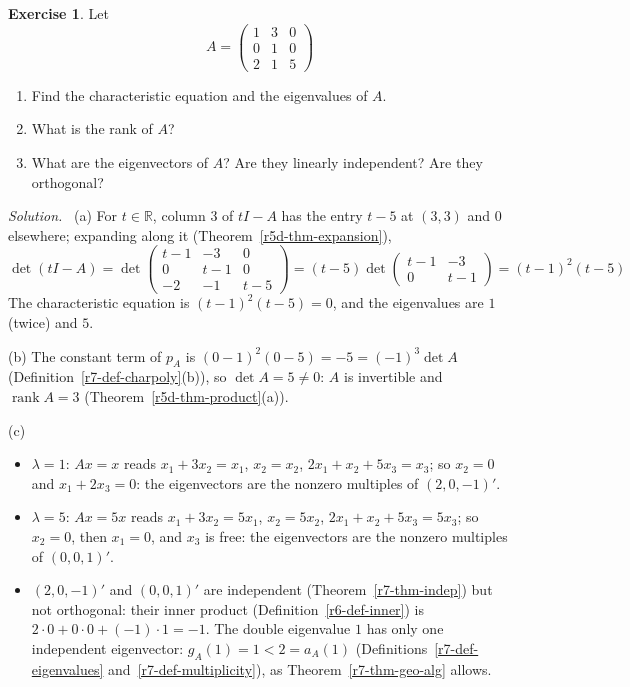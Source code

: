 \documentclass[12pt]{article}
\newcommand{\R}{\mathbb R}
\DeclareMathOperator{\rank}{rank}
\theoremstyle{definition}
\newtheorem{exercise}{Exercise}
\newenvironment{solution}{\par\noindent\textit{Solution.}\ }{\par\smallskip}
\begin{document}
\begin{exercise}\label{r7-ex-am-eigen}
Let
\[
A=\begin{pmatrix}1&3&0\\0&1&0\\2&1&5\end{pmatrix}
\]
\begin{enumerate}
\item Find the characteristic equation and the eigenvalues of \(A\).
\item What is the rank of \(A\)?
\item What are the eigenvectors of \(A\)? Are they linearly independent? Are they orthogonal?
\end{enumerate}
\end{exercise}
\begin{solution}
(a) For \(t\in\R\), column \(3\) of \(tI-A\) has the entry \(t-5\) at \((3,3)\) and \(0\) elsewhere; expanding along
it (Theorem~\ref{r5d-thm-expansion}),
\[
\det(tI-A)=\det\begin{pmatrix}t-1&-3&0\\0&t-1&0\\-2&-1&t-5\end{pmatrix}
=(t-5)\det\begin{pmatrix}t-1&-3\\0&t-1\end{pmatrix}=(t-1)^2(t-5)
\]
The characteristic equation is \((t-1)^2(t-5)=0\), and the eigenvalues are \(1\) (twice) and \(5\).

(b) The constant term of \(p_A\) is \((0-1)^2(0-5)=-5=(-1)^3\det A\) (Definition~\ref{r7-def-charpoly}(b)), so
\(\det A=5\ne0\): \(A\) is invertible and \(\rank A=3\) (Theorem~\ref{r5d-thm-product}(a)).

(c)
\begin{itemize}
\item \(\lambda=1\): \(Ax=x\) reads \(x_1+3x_2=x_1\), \(x_2=x_2\), \(2x_1+x_2+5x_3=x_3\); so \(x_2=0\) and \(x_1+2x_3=0\): the
eigenvectors are the nonzero multiples of \((2,0,-1)'\).
\item \(\lambda=5\): \(Ax=5x\) reads \(x_1+3x_2=5x_1\), \(x_2=5x_2\), \(2x_1+x_2+5x_3=5x_3\); so \(x_2=0\), then \(x_1=0\), and
\(x_3\) is free: the eigenvectors are the nonzero multiples of \((0,0,1)'\).
\item \((2,0,-1)'\) and \((0,0,1)'\) are independent (Theorem~\ref{r7-thm-indep}) but not orthogonal: their inner product
(Definition~\ref{r6-def-inner}) is \(2\cdot0+0\cdot0+(-1)\cdot1=-1\). The double eigenvalue \(1\) has only one independent eigenvector: \(g_A(1)=1<2=a_A(1)\)
(Definitions~\ref{r7-def-eigenvalues} and~\ref{r7-def-multiplicity}), as Theorem~\ref{r7-thm-geo-alg} allows.
\end{itemize}
\end{solution}
\end{document}
